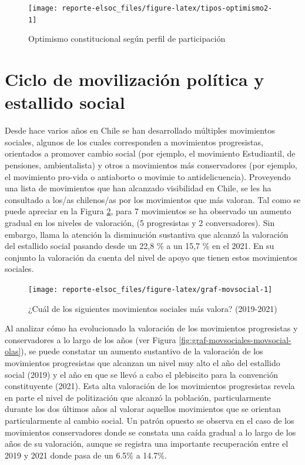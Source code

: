 \documentclass[
  12pt,
]{book}
\begin{document}
\begin{figure}

{\centering \texttt{[image: reporte-elsoc\_files/figure-latex/tipos-optimismo2-1]} 

}

\caption{Optimismo constitucional según perfil de participación}\label{fig:tipos-optimismo2}
\end{figure}

\hypertarget{ciclo-de-movilizaciuxf3n-poluxedtica-y-estallido-social}{%
\section{Ciclo de movilización política y estallido social}\label{ciclo-de-movilizaciuxf3n-poluxedtica-y-estallido-social}}

Desde hace varios años en Chile se han desarrollado múltiples movimientos sociales, algunos de los cuales corresponden a movimientos progresistas, orientados a promover cambio social (por ejemplo, el movimiento Estudiantil, de pensiones, ambientalista) y otros a movimientos más conservadores (por ejemplo, el movimiento pro-vida o antiaborto o movimie to antidelicuencia). Proveyendo una lista de movimientos que han alcanzado visibilidad en Chile, se les ha consultado a los/as chilenos/as por los movimientos que más valoran. Tal como se puede apreciar en la Figura \ref{fig:graf-movsocial}, para 7 movimientos se ha observado un aumento gradual en los niveles de valoración, (5 progresistas y 2 conversadores). Sin embargo, llama la atención la disminución sustantiva que alcanzó la valoración del estallido social pasando desde un 22,8 \% a un 15,7 \% en el 2021. En su conjunto la valoración da cuenta del nivel de apoyo que tienen estos movimientos sociales.

\begin{figure}

{\centering \texttt{[image: reporte-elsoc\_files/figure-latex/graf-movsocial-1]} 

}

\caption{¿Cuál de los siguientes movimientos sociales más valora? (2019-2021)}\label{fig:graf-movsocial}
\end{figure}

Al analizar cómo ha evolucionado la valoración de los movimientos progresistas y conservadores a lo largo de los años (ver Figura \ref{fig:graf-movsociales-movsocial-olas}), se puede constatar un aumento sustantivo de la valoración de los movimientos progresistas que alcanzan un nivel muy alto el año del estallido social (2019) y el año en que se llevó a cabo el plebiscito para la convención constituyente (2021). Esta alta valoración de los movimientos progresistas revela en parte el nivel de politización que alcanzó la población, particularmente durante los dos últimos años al valorar aquellos movimientos que se orientan particularmente al cambio social. Un patrón opuesto se observa en el caso de los movimientos conservadores donde se constata una caída gradual a lo largo de los años de su valoración, aunque se registra una importante recuperación entre el 2019 y 2021 donde pasa de un 6.5\% a 14.7\%.
\end{document}
